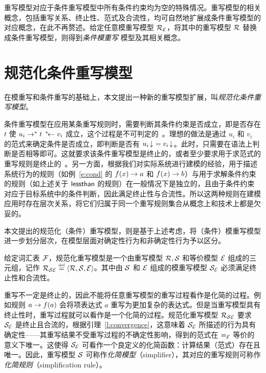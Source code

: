 重写模型对应于条件重写模型中所有条件约束均为空的特殊情况。重写模型的相关概念，包括重写关系、终止性、范式及合流性，均可自然地扩展成条件重写模型的对应概念，在此不再赘述。给定任意模重写模型 $\mathcal{R}_{\mathcal{E}}$，将其中的重写模型 $\mathcal{R}$ 替换成条件重写模型，则得到\emph{条件模重写} 模型及其相关概念。


\section{规范化条件重写模型}
\label{s:normalrs}

在模重写和条件重写的基础上，本文提出一种新的重写模型扩展，叫\emph{规范化条件重写模型}。

条件重写模型在应用某条重写规则时，需要判断其条件约束是否成立，即是否存在 $t$ 使 $u_i\lrps{*}{}t\rlps{*}{}v_i$ 成立，这个过程是不可判定的~\cite{DBLP:journals/ipl/Jacquemard03}。理想的做法是通过 $u_i$ 和 $v_i$ 的范式来确定条件是否成立，即判断是否有 ${{u_i}\!\downarrow_{}} = {{v_i}\!\downarrow_{}}$。此时，只需要在语法上判断是否相等即可。这就要求该条件重写模型是终止的，或者至少要求用于求范式的重写规则是终止的~\cite{DBLP:conf/cade/DershowitzOS88,DBLP:journals/tcs/DershowitzO90,DBLP:conf/rta/BertlingG89}。另一方面，根据我们对实际系统进行建模的经验，用于描述系统行为的规则（如例~\ref{e:cond} 的 $f(x)\rightarrow a$ 和 $f(x)\rightarrow b$）与用于求解条件约束的规则（如上述关于 $\operatorname{\mathsf{lessthan}}$ 的规则）在一般情况下是独立的，且由于条件约束对应于目标系统中的条件判断，因此满足终止性与合流性。所以这两种规则在建模应用时存在层次关系，将它们归属于同一个重写规则集合从概念上和技术上都是欠妥的。

本文提出的规范化（条件）重写模型，则是基于上述考虑，将（条件）模重写模型进一步划分层次，在模型层面对确定性行为和非确定性行为予以区分。


\begin{definition}[规范化重写模型]
\label{d:normalrew-sys}
给定词汇表 $\mathcal{F}$，规范化重写模型是一个由重写模型 $\mathcal{R},\mathcal{S}$ 和等价模型 $\mathcal{E}$ 组成的三元组，记作 $\mathcal{R}_{\mathcal{S}\mathcal{E}} \stackrel{\text{\tiny def}}{=} \langle \mathcal{R}, \mathcal{S}, \mathcal{E} \rangle$。其中由 $\mathcal{S}$ 和 $\mathcal{E}$ 组成的模重写模型 $\mathcal{S}_{\mathcal{E}}$ 必须满足终止性和合流性。
\end{definition}

重写不一定是终止的，因此不能将任意重写模型的重写过程看作是化简的过程。例如规则 $a\rightarrow f(a)$ 会将项表达式 $a$ 重写为更加复杂的表达式。但是当重写模型具有终止性时，重写过程就可以看作是一个化简的过程。规范化重写模型 $\mathcal{R}_{\mathcal{S}\mathcal{E}}$ 要求 $\mathcal{S}_{\mathcal{E}}$ 是终止且合流的，根据引理~\ref{l:convergence}，这意味着 $\mathcal{S}_{\mathcal{E}}$ 所描述的行为具有确定性——其重写结果不受重写过程的不确定性影响，得到的范式在 $=_{\mathcal{E}}$ 等价的意义下唯一。这使得 $\mathcal{S}_{\mathcal{E}}$ 可看作一个良定义的化简函数：计算结果（范式）存在且唯一。因此，重写模型 $\mathcal{S}$ 可称作\emph{化简模型}（simplifier），其对应的重写规则可称作\emph{化简规则}（simplification rule）。

